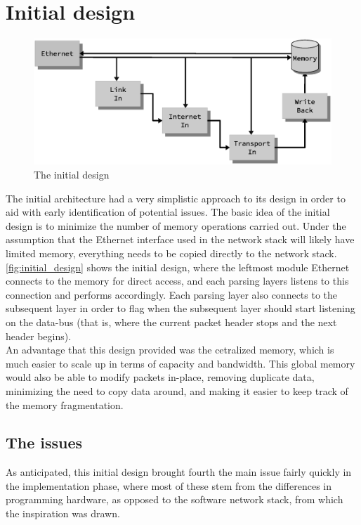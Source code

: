 \section{Initial design}

\begin{figure}
    \centering
    \includegraphics[scale=0.45]{design/design_0.eps}
    \caption{The initial design}
    \label{fig:initial_design}
\end{figure}

The initial architecture had a very simplistic approach to its design in order
to aid with early identification of potential issues.
The basic idea of the initial design is to minimize the number of memory
operations carried out. Under the assumption that the Ethernet interface used in the network
stack will likely have limited memory, everything needs to be copied directly to
the network stack. \autoref{fig:initial_design} shows the initial design, where the
leftmost module Ethernet connects to the memory for direct access, and each
parsing layers listens to this connection and performs accordingly. Each parsing
layer also connects to the subsequent layer in order to flag when the subsequent
layer should start listening on the data-bus (that is, where the current packet
header stops and the next header begins).\\
An advantage that this design provided was the cetralized memory, which is much
easier to scale up in terms of capacity and bandwidth. This global memory would
also be able to modify packets in-place, removing duplicate data, minimizing the
need to copy data around, and making it easier to keep track of the memory
fragmentation.

\subsection{The issues}
As anticipated, this initial design brought fourth the main issue fairly quickly
in the implementation phase, where most of these stem from the differences in
programming hardware, as opposed to the software network stack, from which the
inspiration was drawn.

